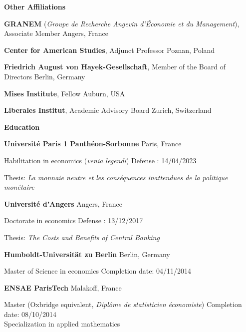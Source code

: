 \documentclass[11pt]{article}
\begin{document}
\vspace{12pt}

\begin{center}
    \textbf{Other Affiliations}
\end{center}

\textbf{GRANEM} (\textit{Groupe de Recherche Angevin d’Économie et du Management}), Associate Member \hfill	Angers, France

\textbf{Center for American Studies}, Adjunct Professor  \hfill	Poznan, Poland

\textbf{Friedrich August von Hayek-Gesellschaft}, Member of the Board of Directors \hfill	Berlin, Germany

\textbf{Mises Institute}, Fellow \hfill	Auburn, USA

\textbf{Liberales Institut}, Academic Advisory Board \hfill	Zurich, Switzerland 

\vspace{12pt}

\begin{center}
    \textbf{Education}
\end{center}
\textbf{Université Paris 1 Panthéon-Sorbonne} \hfill Paris, France

Habilitation in economics (\textit{venia legendi}) \hfill Defense : 14/04/2023 

Thesis: \textit{La monnaie neutre et les conséquences inattendues de la politique monétaire}

\vspace{6pt}

\textbf{Université d'Angers} \hfill Angers, France

Doctorate in economics \hfill Defense : 13/12/2017 

Thesis: \textit{The Costs and Benefits of Central Banking}

\vspace{6pt}

\textbf{Humboldt-Universität zu Berlin} \hfill Berlin, Germany

Master of Science in economics \hfill Completion date: 04/11/2014

\vspace{6pt}

\textbf{ENSAE ParisTech} \hfill Malakoff, France

Master (Oxbridge equivalent, \textit{Diplôme de statisticien économiste}) \hfill Completion date: 08/10/2014 \\
Specialization in applied mathematics 
\end{document}
